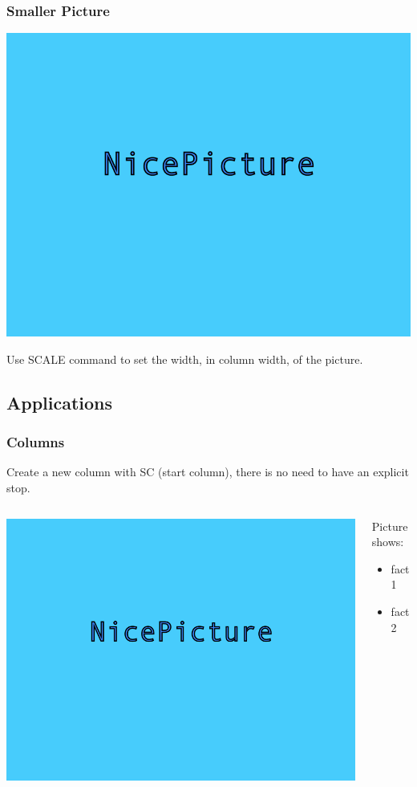 \begin{frame}[fragile]
\frametitle{Smaller Picture}
\centerline{\includegraphics[width=0.3\columnwidth]{./picture.png}}
 


Use SCALE command to set the width, in column width, of the picture.


\end{frame}
\subsection{Applications}
\frame{\tableofcontents[sectionstyle=show/hide,subsectionstyle=show/shaded/hide]}

\begin{frame}[fragile]
\frametitle{Columns}
Create a new column with SC (start column), there is no need to have an explicit stop.


\begin{columns}

\begin{column}{0.5\textwidth}



\centerline{\includegraphics[width=0.9\columnwidth]{./picture.png}}



\end{column}

\begin{column}{0.5\textwidth}



Picture shows:


\begin{itemize}
  \item fact 1


  \item fact 2


\end{itemize}
\end{column}
\end{columns}
\end{frame}

